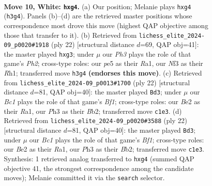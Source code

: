 \documentclass[11pt]{article}
\begin{document}
\clearpage

\begin{figure}[p]\centering
\begin{subfigure}{0.46\textwidth}\centering
\resizebox{\linewidth}{!}{%
\newchessgame
\chessboard[
  setfen={rnbq1rk1/ppp3bp/5pp1/4p3/2P1P1n1/2N2N1P/PP2BPP1/1RBQK2R w K - 0 10},
  showmover=false,
  pgfstyle=straightmove, color=movearrow, markmove={h3-g4}
]}
\caption{}
\end{subfigure}\hfill
\begin{subfigure}{0.46\textwidth}\centering
\resizebox{\linewidth}{!}{%
\newchessgame
\chessboard[
  setfen={rnbq1rk1/pp4bp/2p2pp1/3p4/P2P4/2N2Nn1/1PP1BPPP/R2QK2R w KQ - 0 12},
  showmover=false,
  pgfstyle=straightmove, color=movearrow, markmove={h2-g3}
]}
\caption{}
\end{subfigure}
\\[4pt]
\begin{subfigure}{0.46\textwidth}\centering
\resizebox{\linewidth}{!}{%
\newchessgame
\chessboard[
  setfen={r1bq1rk1/p3bppp/1pn1pn2/8/1PN5/P3PN2/1B3PPP/R2QKB1R w KQ - 1 12},
  showmover=false,
  pgfstyle=straightmove, color=movearrow, markmove={f1-d3}
]}
\caption{}
\end{subfigure}\hfill
\begin{subfigure}{0.46\textwidth}\centering
\resizebox{\linewidth}{!}{%
\newchessgame
\chessboard[
  setfen={r1bq1rk1/p3bppp/1pn1pn2/8/1PN5/P3PN2/1B3PPP/R2QKB1R w KQ - 1 12},
  showmover=false,
  pgfstyle=straightmove, color=movearrow, markmove={f1-d3}
]}
\caption{}
\end{subfigure}
\caption{\textbf{Move 10, White: \texttt{hxg4}.} (a) Our position; Melanie plays \texttt{hxg4} (\texttt{h3g4}). Panels (b)--(d) are the retrieved master positions whose correspondence most drove this move (highest QAP objective among those that transfer to it). (b) Retrieved from \texttt{lichess\_elite\_2024-09\_p0020\#1918} (ply 22) [structural distance $d$=69, QAP obj=41]: the master played \texttt{hxg3}; under $\mu$ our \emph{Ph3} plays the role of that game's \emph{Ph2}; cross-type roles: our \emph{p}e5 as their \emph{R}a1, our \emph{N}f3 as their \emph{R}h1; transferred move \texttt{h3g4} \textbf{(endorses this move)}. (c) Retrieved from \texttt{lichess\_elite\_2024-09\_p0013\#1700} (ply 22) [structural distance $d$=81, QAP obj=40]: the master played \texttt{Bd3}; under $\mu$ our \emph{Bc1} plays the role of that game's \emph{Bf1}; cross-type roles: our \emph{B}e2 as their \emph{R}a1, our \emph{P}h3 as their \emph{B}b2; transferred move \texttt{c1e3}. (d) Retrieved from \texttt{lichess\_elite\_2024-09\_p0020\#3588} (ply 22) [structural distance $d$=81, QAP obj=40]: the master played \texttt{Bd3}; under $\mu$ our \emph{Bc1} plays the role of that game's \emph{Bf1}; cross-type roles: our \emph{B}e2 as their \emph{R}a1, our \emph{P}h3 as their \emph{B}b2; transferred move \texttt{c1e3}. Synthesis: 1 retrieved analog transferred to \texttt{hxg4} (summed QAP objective 41, the strongest correspondence among the candidate moves); Melanie committed it via the \texttt{search} selector.}
\label{fig:thought-m18}
\end{figure}
\end{document}
